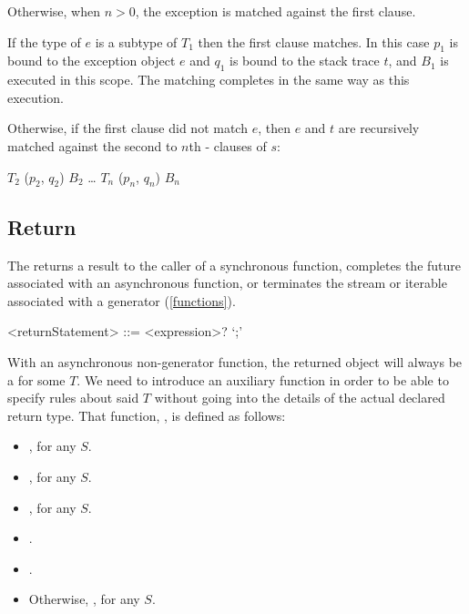 \documentclass[makeidx]{article}
\begin{document}
{\LMHash{}%
Otherwise, when $n > 0$,
the exception is matched against the first clause.

\LMHash{}%
If the type of $e$ is a subtype of $T_1$ then the first clause matches.
In this case $p_1$ is bound to the exception object $e$
and $q_1$ is bound to the stack trace $t$,
and $B_1$ is executed in this scope.
The matching completes in the same way as this execution.

\LMHash{}%
Otherwise, if the first clause did not match $e$,
then $e$ and $t$ are recursively matched against
the second to $n$th \ON-\CATCH{} clauses of $s$:

\begin{normativeDartCode}
\ON{} $T_2$ \CATCH{} ($p_2$, $q_2$) $B_2$
\ldots
\ON{} $T_n$ \CATCH{} ($p_n$, $q_n$) $B_n$
\end{normativeDartCode}


\subsection{Return}

\LMHash{}%
The 
returns a result to the caller of a synchronous function,
completes the future associated with an asynchronous function,
or terminates the stream or iterable associated with a generator
(\ref{functions}).

\begin{grammar}
<returnStatement> ::= \RETURN{} <expression>? `;'
\end{grammar}

\LMHash{}%
With an asynchronous non-generator function,
the returned object will always be a  for some $T$.
We need to introduce an auxiliary function
in order to be able to specify rules about said $T$
without going into the details of the actual declared return type.
That function, \FutureValueTypeOfName, is defined as follows:

\begin{itemize}
\item {},
  for any $S$.
\item {}, for any $S$.
\item {}, for any $S$.
\item \DefEquals{\FutureValueTypeOf{\VOID}}{\VOID}.
\item \DefEquals{\FutureValueTypeOf{\DYNAMIC}}{\DYNAMIC}.
\item Otherwise, ,
  for any $S$.
\end{itemize}

}
\end{document}
